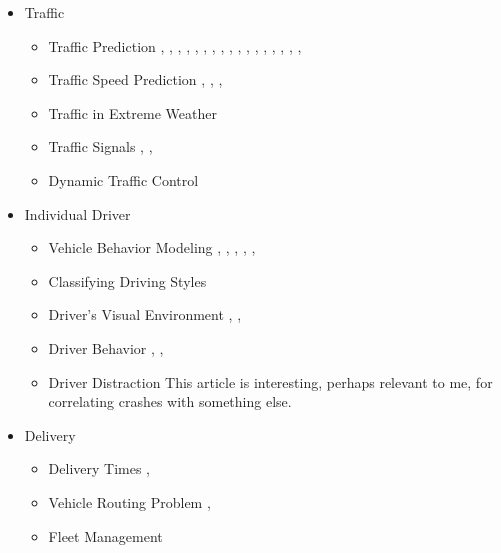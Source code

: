 \begin{itemize}
	\item Traffic
	\begin{itemize}
	\item Traffic Prediction
		\cite{BACHIR2019254},
		\cite{BOGAERTS202062},
		\cite{CUI2020102620},
		\cite{DAI2019142},
		\cite{DO201912},
		\cite{DRCHAL2019370},
		\cite{KUMAR2021103432},
		\cite{LI2021102977},
		\cite{LI2021103185},
		\cite{LI2021103389},
		\cite{MA2020352},
		\cite{ROY2021103339},
		\cite{WANG2020102763},
		\cite{WONG2020247},
		\cite{YANG2021103228},
		\cite{ZHANG2021103372},
		\cite{ZHANG2022103659},
	\item Traffic Speed Prediction 
		\cite{NAIR2020269},
		\cite{REMPE2022103448},
		\cite{WANG2019372},
		\cite{ZHANG2019297}
	\item Traffic in Extreme Weather
		\cite{WANG2020102619}
	\item Traffic Signals
		\cite{GUO2021103416},
		\cite{MAHMOUD2021102930},
		\cite{ZHAO2022103522}
	\item Dynamic Traffic Control  
		\cite{SHOU2022103560}
	\end{itemize}

	\item Individual Driver
	\begin{itemize}
	\item Vehicle Behavior Modeling
		\cite{CHEN2020102646},
		\cite{MA2020102785},
		\cite{MO2021103240}, 
		\cite{RAHMAN2021103310},
		\cite{YAO2021103415},
		\cite{ZHANG2019287}
	\item Classifying Driving Styles 
		\cite{MOHAMMADNAZAR2021102917}
	\item Driver's Visual Environment
		\cite{CAI2022103541},
		\cite{LI2019132},
		\cite{MA2019317}
	\item Driver Behavior
		\cite{MOHAMMADNAZAR2021102917},
		\cite{XING2021103288},
	\item Driver Distraction 
		\cite{CAI2022103541}
	This article is interesting, perhaps relevant to me, for correlating crashes with something else.

	\end{itemize}
	
	\item Delivery
	\begin{itemize}
	\item Delivery Times
		\cite{HUGHES2019289},
	\item Vehicle Routing Problem
		\cite{XU2022103620},
		\cite{ZHANG2020102861}
	\item Fleet Management
		\cite{TURAN2020102829}
	

\end{itemize}
\end{itemize}
